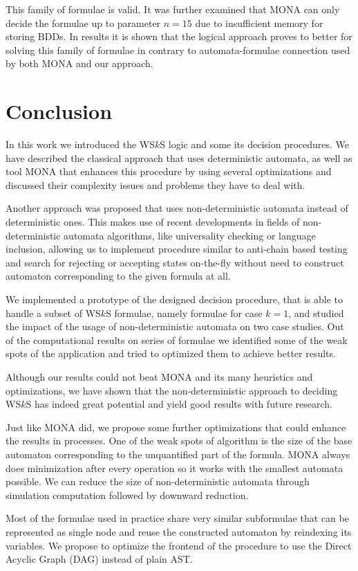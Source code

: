 This family of formulae is valid. It was further examined that \textsc{MONA} can
only decide the formulae up to parameter $n = 15$ due to insufficient memory for
storing BDDs. In results it is shown that the logical approach
\cite{logic-approach} proves to better for solving this family of formulae in
contrary to automata-formulae connection used by both \textsc{MONA} and our approach.

\chapter{Conclusion}\label{summary}

In this work we introduced the WS$k$S logic and some its decision procedures. We
have described the classical approach that uses deterministic automata, as well
as tool \textsc{MONA} that enhances this procedure by using several optimizations and
discussed their complexity issues and problems they have to deal with.

Another approach was proposed that uses non-deterministic automata instead of
deterministic ones. This makes use of recent developments in fields of
non-deterministic automata algorithms, like universality checking or language
inclusion, allowing us to implement procedure similar to anti-chain based
testing \cite{tacas} and search for rejecting or accepting states on-the-fly
without need to construct automaton corresponding to the given formula at all.

We implemented a prototype of the designed decision procedure, that is able to
handle a subset of WS$k$S formulae, namely formulae for case $k = 1$, and
studied the impact of the usage of non-deterministic automata on two case
studies. Out of the computational results on series of formulae we identified
some of the weak spots of the application and tried to optimized them to achieve
better results.

Although our results could not beat \textsc{MONA} and its many heuristics and
optimizations, we have shown that the non-deterministic approach to deciding
WS$k$S has indeed great potential and yield good results with future research.

Just like \textsc{MONA} did, we propose some further optimizations that could
enhance the results in processes. One of the weak spots of algorithm is the size
of the base automaton corresponding to the unquantified part of the formula.
\textsc{MONA} always does minimization after every operation so it works with
the smallest automata possible. We can reduce the size of non-deterministic
automata through simulation computation followed by downward reduction. 

Most of the formulae used in practice share very similar subformulae that can be
represented as single node and reuse the constructed automaton by reindexing its
variables. We propose to optimize the frontend of the procedure to use the
Direct Acyclic Graph (DAG) instead of plain AST. 


